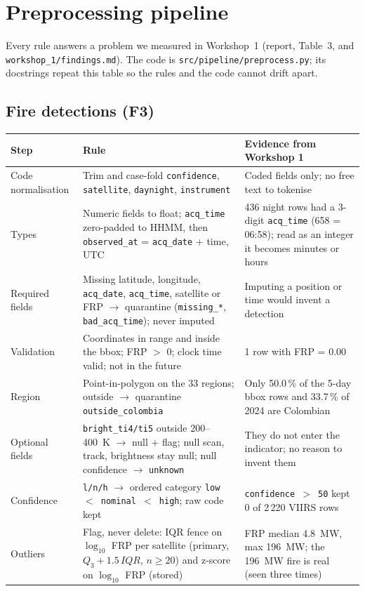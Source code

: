 \documentclass[11pt,a4paper]{article}
\newcommand{\code}[1]{\texttt{\small #1}}
\begin{document}
\section{Preprocessing pipeline}

Every rule answers a problem we measured in Workshop~1 (report, Table~3, and
\code{workshop\_1/findings.md}). The code is \code{src/pipeline/preprocess.py}; its docstrings
repeat this table so the rules and the code cannot drift apart.

\subsection{Fire detections (F3)}

\begin{longtable}{L{2.6cm}L{5.6cm}L{6.3cm}}
\toprule
\textbf{Step} & \textbf{Rule} & \textbf{Evidence from Workshop 1} \\
\midrule
\endhead
Code normalisation & Trim and case-fold \code{confidence}, \code{satellite}, \code{daynight}, \code{instrument} & Coded fields only; no free text to tokenise \\
Types & Numeric fields to float; \code{acq\_time} zero-padded to HHMM, then \code{observed\_at} = \code{acq\_date} + time, UTC & 436 night rows had a 3-digit \code{acq\_time} (658 = 06:58); read as an integer it becomes minutes or hours \\
Required fields & Missing latitude, longitude, \code{acq\_date}, \code{acq\_time}, satellite or FRP $\rightarrow$ quarantine (\code{missing\_*}, \code{bad\_acq\_time}); never imputed & Imputing a position or time would invent a detection \\
Validation & Coordinates in range and inside the bbox; FRP $>$ 0; clock time valid; not in the future & 1 row with FRP = 0.00 \\
Region & Point-in-polygon on the 33 regions; outside $\rightarrow$ quarantine \code{outside\_colombia} & Only 50.0\,\% of the 5-day bbox rows and 33.7\,\% of 2024 are Colombian \\
Optional fields & \code{bright\_ti4/ti5} outside 200--400~K $\rightarrow$ null + flag; null scan, track, brightness stay null; null confidence $\rightarrow$ \code{unknown} & They do not enter the indicator; no reason to invent them \\
Confidence & \code{l/n/h} $\rightarrow$ ordered category \code{low $<$ nominal $<$ high}; raw code kept & \code{confidence $>$ 50} kept 0 of 2\,220 VIIRS rows \\
Outliers & Flag, never delete: IQR fence on $\log_{10}$ FRP per satellite (primary, $Q_3 + 1.5\,IQR$, $n \ge 20$) and z-score on $\log_{10}$ FRP (stored) & FRP median 4.8~MW, max 196~MW; the 196~MW fire is real (seen three times) \\

\end{longtable}
\end{document}
